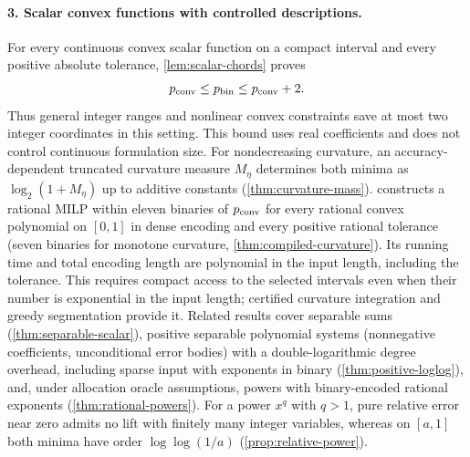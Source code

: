 \paragraph{3. Scalar convex functions with controlled descriptions.}
For every continuous convex scalar function on a compact interval and
every positive absolute tolerance, \cref{lem:scalar-chords} proves
\[
 p_{\mathrm{conv}}\le p_{\mathrm{bin}}\le p_{\mathrm{conv}}+2.
\]
Thus general integer ranges and nonlinear convex constraints save at
most two integer coordinates in this setting. This bound uses real
coefficients and does not control continuous formulation size. For
nondecreasing curvature, an accuracy-dependent truncated curvature
measure $M_\eta$ determines both minima as $\log_2(1+M_\eta)$ up to
additive constants (\cref{thm:curvature-mass}). 
constructs a rational MILP within eleven binaries of $p_{\mathrm{conv}}$ for every
rational convex polynomial on $[0,1]$ in dense encoding and every
positive rational tolerance (seven binaries for monotone curvature,
\cref{thm:compiled-curvature}). Its running time and total encoding length are
polynomial in the input length, including the tolerance. This requires
compact access to the selected intervals even when their number is
exponential in the input length; certified curvature integration and
greedy segmentation provide it.
Related results cover separable sums (\cref{thm:separable-scalar}),
positive separable polynomial systems (nonnegative coefficients,
unconditional error bodies) with a double-logarithmic degree overhead,
including sparse input with exponents in binary
(\cref{thm:positive-loglog}), and, under allocation oracle assumptions,
powers with binary-encoded rational exponents
(\cref{thm:rational-powers}). For a power $x^q$ with $q>1$, pure
relative error near zero admits no lift with finitely many integer
variables, whereas on $[a,1]$ both minima have order $\log\log(1/a)$
(\cref{prop:relative-power}).

